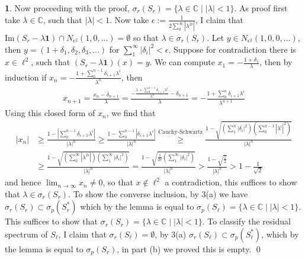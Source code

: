 \documentclass[11pt]{article}
\theoremstyle{definition}
\newtheorem{pb}{}
\newcommand{\set}[1]{\{#1\}}
\newcommand{\abs}[1]{\left\vert#1\right\vert}
\newcommand{\im}{\text{Im}}
\begin{document}
\begin{pb}
        Now proceeding with the proof, \(\sigma_r(S_r) = \set{\lambda \in \mathbb{C} \mid \abs{\lambda} < 1}\). As proof first take \(\lambda \in \mathbb{C}\), such that \(\abs{\lambda} < 1\). Now take \(\epsilon := \frac{1}{2\sum_0^\infty\abs{\lambda^{2i}}}\), I claim that \(\im(S_r - \lambda\mathbf{1}) \cap N_{\epsilon^2}(1,0,\hdots) = \emptyset\) so that \(\lambda \in \sigma_r(S_r)\). Let \(y \in N_{\epsilon^2}(1,0,0,\hdots)\), then \(y = (1 + \delta_1,\delta_2,\delta_3,\hdots)\) for \(\sum_1^\infty \abs{\delta_i}^2 < \epsilon\). Suppose for contradiction there is \(x \in \ell^2\), such that \((S_r - \lambda\mathbf{1})(x) = y\). We can compute \(x_1 = -\frac{1 + \delta_1}{\lambda}\), then by induction if \(x_n = -\frac{1 + \sum_0^{n-1} \delta_{i+1}\lambda^i}{\lambda^n}\), then
        \begin{align*}
            x_{n+1} = \frac{x_n - \delta_{n+1}}{\lambda} = \frac{-\frac{1 + \sum_0^{n-1} \delta_{i+1}\lambda^i}{\lambda^n} - \delta_{n+1}}{\lambda} = -\frac{1 + \sum_0^n \delta_{i+1}\lambda^i}{\lambda^{n+1}}
        \end{align*}
        Using this closed form of \(x_n\), we find that
        \begin{align*}
            \abs{x_n} &\geq \frac{1 - \abs{\sum_0^{n-1}\delta_{i+1}\lambda^i}}{\abs{\lambda}^n} \geq \frac{1 - \sum_0^{n-1}\abs{\delta_{i+1}\lambda^i}}{\abs{\lambda}^n} \overset{\text{Cauchy-Schwartz}}{\geq} \frac{1 - \sqrt{(\sum_1^n \abs{\delta_i}^2)(\sum_0^{n-1}\abs{\lambda^i}^2)}}{\abs{\lambda}^n} \\
            &\geq \frac{1 - \sqrt{(\sum_0^\infty \abs{\lambda^{2i}})(\sum_1^\infty \abs{\delta_i}^2)}}{\abs{\lambda}^n} = \frac{1 - \sqrt{\frac{1}{2 \epsilon}(\sum_1^\infty \abs{\delta_i}^2)}}{\abs{\lambda}^n} > \frac{1 - \sqrt{\frac12}}{\abs{\lambda}^n} > 1 - \frac{1}{\sqrt{2}}
        \end{align*}
        and hence \(\lim_{n \to \infty} x_n \neq 0\), so that \(x \not \in \ell^2\) a contradiction, this suffices to show that \(\lambda \in \sigma_r(S_r)\). To show the converse inclusion, by 3(a) we have \(\sigma_r(S_r) \subset \sigma_p(S_r^*)\) which by the lemma is equal to \(\sigma_p(S_\ell) = \set{\lambda \in \mathbb{C} \mid \abs{\lambda} < 1}\). This suffices to show that \(\sigma_r(S_r) = \set{\lambda \in \mathbb{C} \mid \abs{\lambda} < 1}\).
        To classify the residual spectrum of \(S_\ell\), I claim that \(\sigma_r(S_\ell) = \emptyset\), by 3(a) \(\sigma_r(S_\ell) \subset \sigma_p(S_\ell^*)\), which by the lemma is equal to \(\sigma_p(S_r)\), in part (b) we proved this is empty. \qed


\end{pb}
\end{document}
